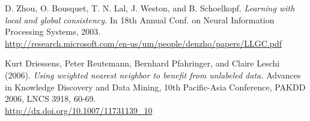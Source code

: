 %

\begin{thebibliography}{999}

	D. Zhou, O. Bousquet, T. N. Lal, J. Weston, and B. Schoelkopf. 
	\textit{Learning with local and global consistency.} In 18th Annual Conf. on 
	Neural Information Processing Systems, 2003. \\
	\url{http://research.microsoft.com/en-us/um/people/denzho/papers/LLGC.pdf}{}
	
	Kurt Driessens, Peter Reutemann, Bernhard Pfahringer, and Claire Leschi 
	(2006). \textit{Using weighted nearest neighbor to benefit from unlabeled data.}
	Advances in Knowledge Discovery and Data Mining, 10th Pacific-Asia 
	Conference, PAKDD 2006, LNCS 3918, 60-69. \\
	\url{http://dx.doi.org/10.1007/11731139_10}{}

\end{thebibliography}
